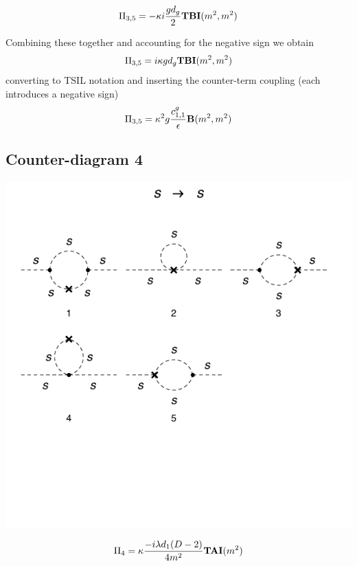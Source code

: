 \documentclass[11pt]{article}
\begin{document}
 \begin{align}
 \Pi_{3,5} = - \kappa i \frac{g d_g}{2} {\tt{\mathbf{TBI}}}(m^2,m^2) 
 \end{align}
  
Combining these together and accounting for the negative sign we obtain
 \begin{align}
 \Pi_{3,5} = i \kappa g d_g {\tt{\mathbf{TBI}}}(m^2,m^2) 
 \end{align}
converting to TSIL notation and inserting the counter-term coupling (each introduces a negative sign)
\begin{align}
 \Pi_{3,5} = \kappa^2 g \frac{c_{1,1}^g}{\epsilon} {\tt{\mathbf{B}}}(m^2,m^2) 
 \end{align}

 
\subsection*{Counter-diagram 4}
\begin{center}
\includegraphics{2loop_4c.pdf}
\end{center}

 \begin{align}
 \Pi_4 =  \kappa \frac{-i \lambda d_1 (D-2)}{ 4 m^2} {\tt{\mathbf{TAI}}}(m^2) 
 \end{align}
 
\end{document}

